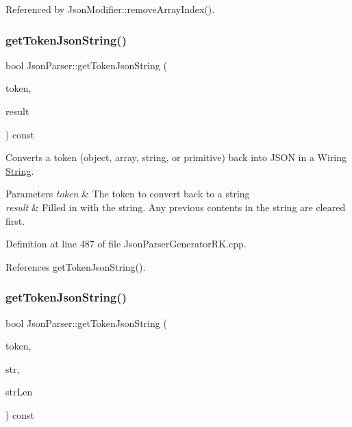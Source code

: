 Referenced by Json\+Modifier\+::remove\+Array\+Index().

\mbox{\label{class_json_parser_a334ccfff663a5d3155a799049896d55c}} 
\subsubsection{\texorpdfstring{get\+Token\+Json\+String()}{getTokenJsonString()}\hspace{0.1cm}{\footnotesize\ttfamily [1/3]}}
{\footnotesize\ttfamily bool Json\+Parser\+::get\+Token\+Json\+String (\begin{DoxyParamCaption}\item[{const \hyperlink{struct_json_parser_generator_r_k_1_1jsmntok__t}{Json\+Parser\+Generator\+R\+K\+::jsmntok\+\_\+t} $\ast$}]{token,  }\item[{\hyperlink{class_string}{String} \&}]{result }\end{DoxyParamCaption}) const}



Converts a token (object, array, string, or primitive) back into J\+S\+ON in a Wiring \hyperlink{class_string}{String}. 


\begin{DoxyParams}{Parameters}
{\em token} & The token to convert back to a string\\
\hline
{\em result} & Filled in with the string. Any previous contents in the string are cleared first. \\
\hline
\end{DoxyParams}


Definition at line 487 of file Json\+Parser\+Generator\+R\+K.\+cpp.



References get\+Token\+Json\+String().

\mbox{\label{class_json_parser_af235693afede52de81794e3773e5cff4}} 
\subsubsection{\texorpdfstring{get\+Token\+Json\+String()}{getTokenJsonString()}\hspace{0.1cm}{\footnotesize\ttfamily [2/3]}}
{\footnotesize\ttfamily bool Json\+Parser\+::get\+Token\+Json\+String (\begin{DoxyParamCaption}\item[{const \hyperlink{struct_json_parser_generator_r_k_1_1jsmntok__t}{Json\+Parser\+Generator\+R\+K\+::jsmntok\+\_\+t} $\ast$}]{token,  }\item[{char $\ast$}]{str,  }\item[{size\+\_\+t \&}]{str\+Len }\end{DoxyParamCaption}) const}



